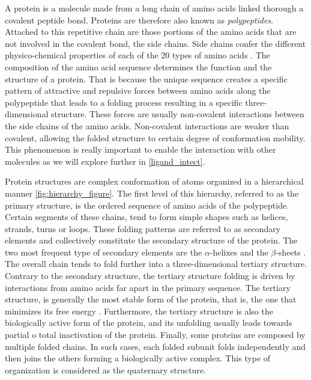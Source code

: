 \documentclass[12pt, b5paper,twoside]{tesi_upf}
\begin{document}
\par A protein is a molecule made from a long chain of amino acids linked thorough a covalent peptide bond. Proteins are therefore also known as \textit{polypeptides}. Attached to this repetitive chain are those portions of the amino acids that are not involved in the covalent bond, the side chains. Side chains confer the different physico-chemical properties of each of the 20 types of amino acids \cite{thecell2008}. The composition of the amino acid sequence determines the function and the structure of a protein. That is because the unique sequence creates a specific pattern of attractive and repulsive forces between amino acids along the polypeptide that leads to a folding process resulting in a specific three-dimensional structure. These forces are usually non-covalent  interactions between the side chains of the amino acids. Non-covalent interactions are weaker than covalent, allowing the folded structure to certain degree of  conformation mobility. This phenomenon is really important to enable the interaction with other molecules as we will explore further in \ref{ligand_intect}.  
\par Protein structures are complex conformation of atoms organized in a hierarchical manner \ref{fig:hierarchy_figure}. The first level of this hierarchy, referred to as the primary structure, is the ordered sequence of amino acids of the polypeptide. Certain segments of these chains, tend to form simple shapes such as helices, strands, turns or loops.  These folding patterns are referred to as secondary elements and collectively constitute the secondary structure of the protein. The two most frequent type of secondary elements are the $\alpha$-helixes and the $\beta$-sheets \cite{DSSP}. The overall chain tends to fold further into a three-dimensional  tertiary structure. Contrary to the secondary structure, the tertiary structure folding is driven by interactions from amino acids far apart in the primary sequence. The tertiary structure, is generally the most stable form of the protein, that is, the one that minimizes its free energy \cite{Dill1990}. Furthermore, the tertiary structure is also the biologically active form of the protein, and its unfolding usually leads towards partial o total inactivation of the protein. Finally, some proteins are composed by multiple folded chains. In such cases, each folded subunit folds independently and then joins the others forming a biologically active complex. This type of organization is considered as the quaternary structure.
\end{document}
